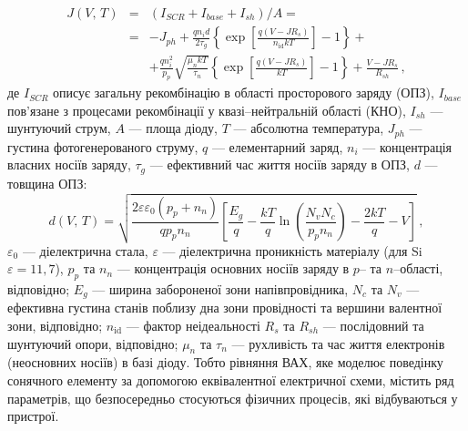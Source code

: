 \begin{eqnarray}
\label{eqSSCIV}
\nonumber J(V,\,T)&=&\left(I_{SCR}+I_{base}+I_{sh}\right)/A=\\
\nonumber &=&-J_{ph}+\frac{qn_id}{2\tau_{g}}\left\{\exp \left[\frac{q(V-JR_s)}{n_\mathrm{id}kT}\right]-1\right\}+\\
&&+\frac{qn_i^2}{p_p}\sqrt{\frac{\mu_nkT}{\tau_n}}\left\{\exp \left[\frac{q(V-JR_s)}{kT}\right]-1\right\}+\frac{V-JR_s}{R_{sh}}\,,
\end{eqnarray}
де
$I_{SCR}$ описує загальну рекомбінацію в області просторового заряду (ОПЗ),
$I_{base}$ пов'язане з процесами рекомбінації у квазі--нейтральній області (КНО),
$I_{sh}$ --- шунтуючий струм,
$A$ --- площа діоду,
$T$ --- абсолютна температура,
$J_{ph}$ --- густина фотогенерованого струму,
$q$ --- елементарний заряд,
$n_i$ --- концентрація власних носіїв заряду,
$\tau_{g}$  --- ефективний час життя носіїв заряду в ОПЗ,
$d$ --- товщина ОПЗ:
\begin{equation}
\label{eqW}
    d(V,\,T)=\sqrt{\frac{2 \varepsilon \varepsilon_0(p_p+n_n)}{q p_p n_n}\left[\frac{E_g}{q}-\frac{kT}{q}\ln\left(\frac{N_vN_c}{p_pn_n}\right)-\frac{2kT}{q}-V\right]} \,,
\end{equation}
$\varepsilon_0$ --- діелектрична стала,
$\varepsilon$ --- діелектрична проникність матеріалу (для Si $\varepsilon=11,7$),
$p_p$ та $n_n$ --- концентрація основних носіїв заряду в $p$-- та $n$--області, відповідно;
$E_g$ --- ширина забороненої зони напівпровідника,
$N_c$ та $N_v$ --- ефективна густина станів поблизу дна зони провідності та вершини валентної зони, відповідно;
$n_\mathrm{id}$ --- фактор неідеальності
$R_s$ та $R_{sh}$ --- послідовний та шунтуючий опори, відповідно;
$\mu_n$ та $\tau_n$ --- рухливість та час життя електронів (неосновних носіїв) в базі діоду.
Тобто
рівняння ВАХ, яке моделює поведінку сонячного елементу за допомогою еквівалентної електричної схеми,
містить ряд параметрів, що безпосередньо стосуються фізичних процесів, які відбуваються у пристрої.

